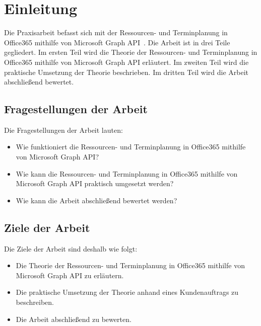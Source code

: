 


\section{Einleitung}\label{sec:einleitung}
Die Praxisarbeit befasst sich mit der Ressourcen- und Terminplanung in Office365 mithilfe von Microsoft Graph API~\cite{microsoftGraphApi}.
Die Arbeit ist in drei Teile gegliedert.
Im ersten Teil wird die Theorie der Ressourcen- und Terminplanung in Office365 mithilfe von Microsoft Graph API erläutert.
Im zweiten Teil wird die praktische Umsetzung der Theorie beschrieben.
Im dritten Teil wird die Arbeit abschließend bewertet.
    \newline
    \subsection{Fragestellungen der Arbeit}\label{subsec:fragestellungen-der-arbeit}
Die Fragestellungen der Arbeit lauten:
    \begin{itemize}
        \item Wie funktioniert die Ressourcen- und Terminplanung in Office365 mithilfe von Microsoft Graph API?
        \item Wie kann die Ressourcen- und Terminplanung in Office365 mithilfe von Microsoft Graph API praktisch umgesetzt werden?
        \item Wie kann die Arbeit abschließend bewertet werden?
    \end{itemize}
    \subsection{Ziele der Arbeit}\label{subsec:ziele-der-arbeit}
Die Ziele der Arbeit sind deshalb wie folgt:
    \begin{itemize}
        \item Die Theorie der Ressourcen- und Terminplanung in Office365 mithilfe von Microsoft Graph API zu erläutern.
        \item Die praktische Umsetzung der Theorie anhand eines Kundenauftrags zu beschreiben.
        \item Die Arbeit abschließend zu bewerten.
    \end{itemize}
